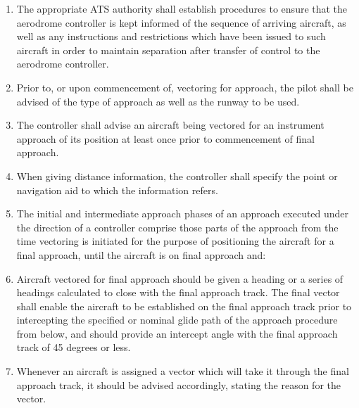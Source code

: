 \begin{enumerate}
    \item The appropriate ATS authority shall establish procedures to ensure that the aerodrome controller is kept informed of the sequence of arriving aircraft, as well as any instructions and restrictions which have been issued to such aircraft in order to maintain separation after transfer of control to the aerodrome controller.
    \item Prior to, or upon commencement of, vectoring for approach, the pilot shall be advised of the type of approach as well as the runway to be used.
    \item The controller shall advise an aircraft being vectored for an instrument approach of its position at least once prior to commencement of final approach.
    \item When giving distance information, the controller shall specify the point or navigation aid to which the information refers.
    \item The initial and intermediate approach phases of an approach executed under the direction of a controller comprise those parts of the approach from the time vectoring is initiated for the purpose of positioning the aircraft for a final approach, until the aircraft is on final approach and:
    

    \item Aircraft vectored for final approach should be given a heading or a series of headings calculated to close with the final approach track. The final vector shall enable the aircraft to be established on the final approach track prior to intercepting the specified or nominal glide path of the approach procedure from below, and should provide an intercept angle with the final approach track of 45 degrees or less.
    \item Whenever an aircraft is assigned a vector which will take it through the final approach track, it should be advised accordingly, stating the reason for the vector.
\end{enumerate}

